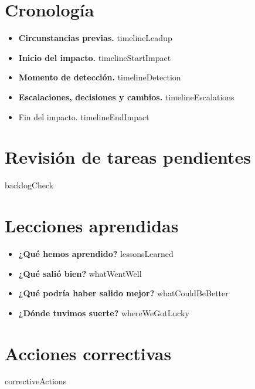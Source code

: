 \documentclass[11pt,a4paper]{article}
\begin{document}
\section{Cronología}
\begin{itemize}
    \item \textbf{Circunstancias previas.}
    \newline
    {{timelineLeadup}}

    \item \textbf{Inicio del impacto.}
    \newline
    {{timelineStartImpact}}

    \item \textbf{Momento de detección.}
    \newline
    {{timelineDetection}}

    \item \textbf{Escalaciones, decisiones y cambios.}
    \newline
    {{timelineEscalations}}

    \item Fin del impacto.
    \newline
    {{timelineEndImpact}}
\end{itemize}

\section{Revisión de tareas pendientes}
{{backlogCheck}}

\section{Lecciones aprendidas}
\begin{itemize}
    \item \textbf{¿Qué hemos aprendido?}
    \newline
    {{lessonsLearned}}

    \item \textbf{¿Qué salió bien?}
    \newline
    {{whatWentWell}}

    \item \textbf{¿Qué podría haber salido mejor?}
    \newline
    {{whatCouldBeBetter}}

    \item \textbf{¿Dónde tuvimos suerte?}
    \newline
    {{whereWeGotLucky}}
\end{itemize}

\section{Acciones correctivas}
{{correctiveActions}}
\end{document}
